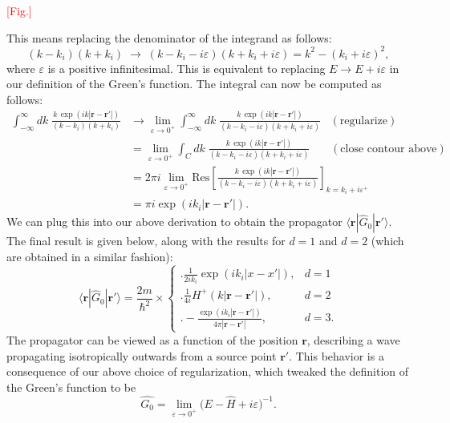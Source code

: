 \documentclass[pra,12pt]{revtex4}
\begin{document}
\textcolor{red}{[Fig.]}

This means replacing the denominator of the integrand as
follows:
$$(k - k_i)(k+k_i) \;\rightarrow\; (k - k_i - i\varepsilon)(k+k_i+i\varepsilon) = k^2 - (k_i+i\varepsilon)^2,$$
where $\varepsilon$ is a positive infinitesimal.  This is equivalent
to replacing $E \rightarrow E + i\varepsilon$ in our definition of the
Green's function.  The integral can now be computed as
follows:
$$\begin{aligned}\int_{-\infty}^\infty dk \; \frac{\displaystyle k\, \exp\left(ik|\mathbf{r}-\mathbf{r}'|\right)}{(k - k_i)(k+k_i)} &\rightarrow \lim_{\varepsilon \rightarrow 0^+} \int_{-\infty}^\infty dk \; \frac{\displaystyle k\, \exp\left(ik|\mathbf{r}-\mathbf{r}'|\right)}{(k - k_i - i\varepsilon)(k+k_i+i\varepsilon)}\;\;\; (\text{regularize}) \\ &= \lim_{\varepsilon \rightarrow 0^+} \int_C dk \; \frac{\displaystyle k\, \exp\left(ik|\mathbf{r}-\mathbf{r}'|\right)}{(k - k_i - i\varepsilon)(k+k_i+i\varepsilon)} \quad\;\;\; (\text{close contour above}) \\ &= 2\pi i \lim_{\varepsilon \rightarrow 0^+} \mathrm{Res}\left[\frac{\displaystyle k\, \exp\left(ik|\mathbf{r}-\mathbf{r}'|\right)}{(k - k_i - i\varepsilon)(k+k_i+i\varepsilon)}\right]_{k=k_i+i\varepsilon^+} \\ &= \pi i \exp\left(ik_i|\mathbf{r}-\mathbf{r}'|\right).\end{aligned}$$
We can plug this into our above derivation to obtain the propagator
$\langle\mathbf{r}|\hat{G}_0|\mathbf{r}'\rangle$.  The final result is
given below, along with the results for $d=1$ and $d=2$ (which are
obtained in a similar fashion):
$$\boxed{\;\;\;\langle\mathbf{r}|\hat{G}_0|\mathbf{r}'\rangle = \frac{2m}{\hbar^2} \times \begin{cases} \Bigg.\displaystyle\frac{1}{2ik_i} \exp\left(ik_i|x-x'|\right),& d=1\\ \Bigg. \displaystyle\frac{1}{4i} H^+(k|\mathbf{r}-\mathbf{r'}|), & d=2 \\ \displaystyle \Bigg. - \frac{\exp\left(ik_i|\mathbf{r}-\mathbf{r}'|\right)}{4\pi|\mathbf{r}-\mathbf{r}'|}, & d = 3.  \end{cases}\;\;\;}$$
The propagator can be viewed as a function of the position
$\mathbf{r}$, describing a wave propagating isotropically outwards
from a source point $\mathbf{r}'$.  This behavior is a consequence of
our above choice of regularization, which tweaked the definition of
the Green's function to be
$$\boxed{\quad\hat{G_0} = \lim_{\varepsilon\rightarrow 0^+} \big(E - \hat{H} + i \varepsilon\big)^{-1}.\quad}$$
\end{document}
